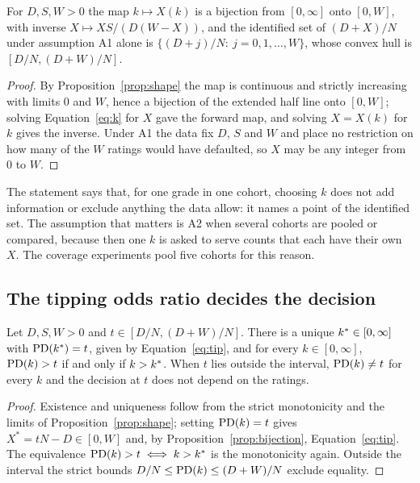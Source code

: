 \begin{proposition}[$k$ is a reparameterisation]
\label{prop:bijection}
For $D,S,W>0$ the map $k\mapsto X(k)$ is a bijection from $[0,\infty]$ onto $[0,W]$, with inverse $X\mapsto XS/(D(W-X))$, and the identified set of $(D+X)/N$ under assumption A1 alone is $\{(D+j)/N:\ j=0,1,\dots,W\}$, whose convex hull is $[D/N,(D+W)/N]$.
\end{proposition}
\begin{proof}
By Proposition~\ref{prop:shape} the map is continuous and strictly increasing with limits $0$ and $W$, hence a bijection of the extended half line onto $[0,W]$; solving Equation~\eqref{eq:k} for $X$ gave the forward map, and solving $X=X(k)$ for $k$ gives the inverse. Under A1 the data fix $D$, $S$ and $W$ and place no restriction on how many of the $W$ \wdn{} ratings would have defaulted, so $X$ may be any integer from $0$ to $W$.
\end{proof}

The statement says that, for one grade in one cohort, choosing $k$ does not add information or exclude anything the data allow: it names a point of the identified set. The assumption that matters is A2 when several cohorts are pooled or compared, because then one $k$ is asked to serve counts that each have their own $X$. The coverage experiments pool five cohorts for this reason.

\subsection{The tipping odds ratio decides the decision}

\begin{proposition}[tipping]
\label{prop:tipping}
Let $D,S,W>0$ and $t\in[D/N,(D+W)/N]$. There is a unique $k^{*}\in[0,\infty]$ with $\mathrm{PD}(k^{*})=t$, given by Equation~\eqref{eq:tip}, and for every $k\in[0,\infty]$, $\mathrm{PD}(k)>t$ if and only if $k>k^{*}$. When $t$ lies outside the interval, $\mathrm{PD}(k)\ne t$ for every $k$ and the decision at $t$ does not depend on the \wdn{} ratings.
\end{proposition}
\begin{proof}
Existence and uniqueness follow from the strict monotonicity and the limits of Proposition~\ref{prop:shape}; setting $\mathrm{PD}(k)=t$ gives $X^{\ast}=tN-D\in[0,W]$ and, by Proposition~\ref{prop:bijection}, Equation~\eqref{eq:tip}. The equivalence $\mathrm{PD}(k)>t\iff k>k^{*}$ is the monotonicity again. Outside the interval the strict bounds $D/N\le\mathrm{PD}(k)\le(D+W)/N$ exclude equality.
\end{proof}

